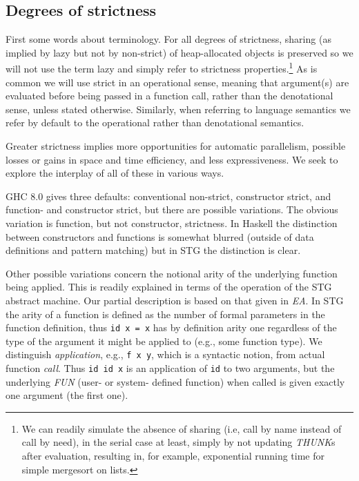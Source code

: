 \documentclass{llncs}
\begin{document}
\subsection{Degrees of strictness}
First some words about terminology.  For all degrees of strictness, sharing
(as implied by lazy but not by non-strict) of heap-allocated objects is
preserved so we will not use the term lazy and simply refer to
strictness properties.\footnote{%
  We can readily simulate the absence of sharing (i.e, call by name instead of
  call by need), in the serial case at least, simply by not updating \emph{THUNK}s
after evaluation, resulting in, for example, exponential running time for
simple mergesort on lists.}
  As is common we will use strict in an operational
sense, meaning that argument(s) are evaluated before being passed in a
function call, rather than the denotational sense, unless stated otherwise.
Similarly, when referring to language semantics we refer by default to the
operational rather than denotational semantics.

Greater strictness implies more opportunities for automatic parallelism,
possible losses or gains in space and time efficiency, and less expressiveness.  We
seek to explore the interplay of all of these in various ways.

GHC 8.0 gives three defaults: conventional non-strict, constructor strict, and
function- and constructor strict, but there are possible variations.  The
obvious variation is function, but not constructor, strictness.  In Haskell
the distinction between constructors and functions is somewhat blurred
(outside of data definitions and pattern matching) but in STG the distinction
is clear.

Other possible variations concern the notional arity of the underlying
function being applied.  This is readily explained in terms of the operation
of the STG abstract machine.  Our partial description is based on that given
in \emph{EA}.
%
In STG the arity of a function is defined as the number of formal parameters
in the function definition, thus \texttt{id x = x} has by definition arity one
regardless of the type of the argument it might be applied to (e.g., some
function type).  We distinguish \emph{application}, e.g., \texttt{f x y},
which is a syntactic notion, from actual function \emph{call}. Thus \texttt{id
  id x} is an application of \texttt{id} to two arguments, but the underlying
\emph{FUN} (user- or system- defined function) when called is given exactly
one argument (the first one).
\end{document}
